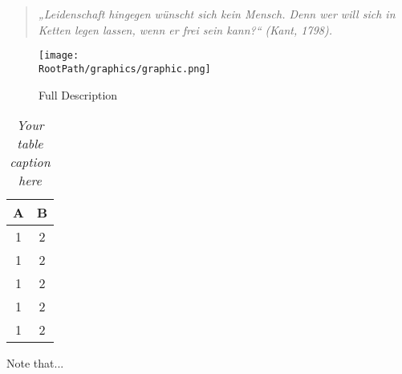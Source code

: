 \begin{quote}
  \centering
  \emph{„Leidenschaft hingegen wünscht sich kein Mensch. Denn wer will sich in Ketten legen lassen, wenn er frei sein kann?“ (Kant, 1798).}
\end{quote}

\begin{figure}[ht]
\texttt{[image: \\RootPath/graphics/graphic.png]}
\caption[Short Description]{Full Description}
\end{figure}

\begin{table}
	\centering
	\begin{threeparttable}
		\caption{\emph{Your table caption here}}
		\small
		\begin{tabular}[c]{cc}
			\toprule
			A & B \\
			\midrule
			1 & 2 \\
			1 & 2 \\
			1 & 2 \\
			1 & 2 \\
			1 & 2 \\
			\bottomrule
		\end{tabular}
		\begin{tablenotes}
			\footnotesize
			\item Note that...
		\end{tablenotes}
	\end{threeparttable}
\end{table}


